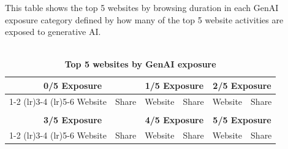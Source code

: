 \documentclass[12pt]{article}
\begin{document}
\begin{table}[t!]
    \caption{\\ \centering  \textbf{Top 5 websites by GenAI exposure}}

 
\vspace{-0.1cm} \footnotesize  This table shows the top 5 websites by browsing duration in each GenAI exposure category defined by how many of the top 5 website activities are exposed to generative AI. 

\label{tab:browsesharesbyexposure}
\vspace{0.1cm}
\small
\centering
    \begin{tabular}{lc|lc|lc}%
    \multicolumn{2}{c}{\textbf{0/5 Exposure}} & \multicolumn{2}{c}{\textbf{1/5 Exposure}}  & \multicolumn{2}{c}{\textbf{2/5 Exposure}}   \\   
     \cmidrule(lr){1-2}  \cmidrule(lr){3-4}  \cmidrule(lr){5-6}  
    {Website} & {Share} &   {Website} & {Share} &   {Website} & {Share}  \\ \hline   
                         \\
\midrule 
    \multicolumn{2}{c}{\textbf{3/5 Exposure}} & \multicolumn{2}{c}{\textbf{4/5 Exposure}}  & \multicolumn{2}{c}{\textbf{5/5 Exposure}}   \\   
    \cmidrule(lr){1-2}  \cmidrule(lr){3-4}  \cmidrule(lr){5-6}  
      {Website} & {Share} &   {Website} & {Share} &   {Website} & {Share}  \\ \hline
                         
    \end{tabular}
\end{table}
\end{document}
